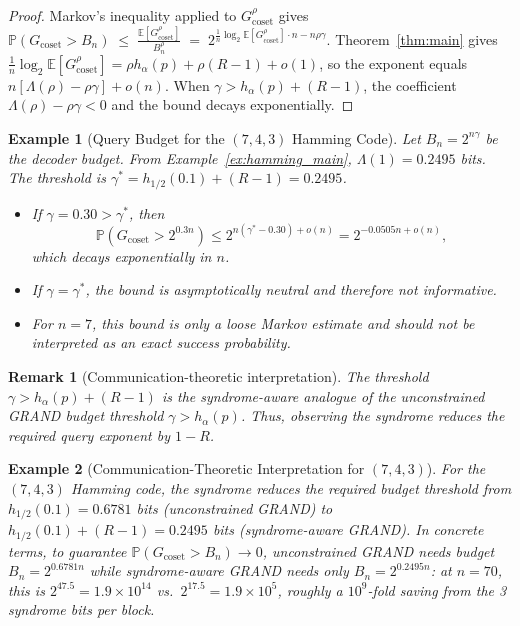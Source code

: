 \documentclass[journal,10pt,onecolumn]{IEEEtran}
\newtheorem{remark}{Remark}
\newtheorem{example}{Example}
\newcommand{\Eb}{\mathbb{E}}
\newcommand{\Pb}{\mathbb{P}}
\begin{document}
\begin{proof}
Markov's inequality applied to $G_{\mathrm{coset}}^\rho$ gives
\(
    \Pb(G_{\mathrm{coset}}>B_n)
    \;\le\;
    \frac{\Eb[G_{\mathrm{coset}}^\rho]}{B_n^\rho}
    \;=\;
    2^{\frac{1}{n}\log_2\Eb[G_{\mathrm{coset}}^\rho]\cdot n
       -n\rho\gamma}.
\)
Theorem~\ref{thm:main} gives
$\frac{1}{n}\log_2\Eb[G_{\mathrm{coset}}^\rho]
=\rho h_\alpha(p)+\rho(R-1)+o(1)$,
so the exponent equals $n[\Lambda(\rho)-\rho\gamma]+o(n)$.
When $\gamma>h_\alpha(p)+(R-1)$, the coefficient
$\Lambda(\rho)-\rho\gamma<0$ and the bound decays
exponentially.
\end{proof}

\begin{example}[Query Budget for the $(7,4,3)$ Hamming Code]
\label{ex:hamming_budget}
Let $B_n=2^{n\gamma}$ be the decoder budget.
From Example~\ref{ex:hamming_main}, $\Lambda(1) = 0.2495$ bits.
The threshold is $\gamma^*=h_{1/2}(0.1)+(R-1) = 0.2495$.
\begin{itemize}
\item If $\gamma=0.30>\gamma^*$, then
\[
\Pb(G_{\mathrm{coset}}>2^{0.3n})
\le 2^{n(\gamma^*-0.30)+o(n)}
=2^{-0.0505n+o(n)},
\]
which decays exponentially in $n$.
\item If $\gamma=\gamma^*$, the bound is asymptotically neutral
and therefore not informative.
\item For $n=7$, this bound is only a loose Markov estimate and should
not be interpreted as an exact success probability.
\end{itemize}
\end{example}



\begin{remark}[Communication-theoretic interpretation]
The threshold $\gamma>h_\alpha(p)+(R-1)$ is the syndrome-aware analogue of the unconstrained GRAND budget threshold $\gamma>h_\alpha(p)$. Thus, observing the syndrome reduces the required query exponent by $1-R$.
\end{remark}

\begin{example}[Communication-Theoretic Interpretation for $(7,4,3)$]
\label{ex:hamming_comm}
For the $(7,4,3)$ Hamming code, the syndrome reduces the
required budget threshold from
$h_{1/2}(0.1) = 0.6781$ bits (unconstrained GRAND)
to $h_{1/2}(0.1)+(R-1) = 0.2495$ bits (syndrome-aware GRAND).
In concrete terms, to guarantee $\Pb(G_{\mathrm{coset}}>B_n)\to0$,
unconstrained GRAND needs budget $B_n=2^{0.6781n}$ while
syndrome-aware GRAND needs only $B_n=2^{0.2495n}$: at $n=70$,
this is $2^{47.5} = 1.9\times10^{14}$ vs.\
$2^{17.5} = 1.9\times10^5$, roughly a $10^9$-fold saving
from the 3 syndrome bits per block.
\end{example}
\end{document}
